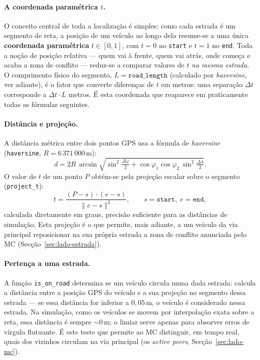 \documentclass[11pt,a4paper]{article}
\begin{document}
\paragraph{A coordenada paramétrica $t$.} O conceito central de toda a localização é
simples: como cada estrada é um segmento de reta, a posição de um veículo ao longo dela
resume-se a uma única \textbf{coordenada paramétrica} $t\in[0,1]$, com $t=0$ no
\texttt{start} e $t=1$ no \texttt{end}. Toda a noção de posição relativa --- quem vai à
frente, quem vai atrás, onde começa e acaba a zona de conflito --- reduz-se a comparar
valores de $t$ \emph{na mesma estrada}. O comprimento físico do segmento,
$L=\texttt{road\_length}$ (calculado por \emph{haversine}, ver adiante), é o fator que
converte diferenças de $t$ em metros: uma separação $\Delta t$ corresponde a $\Delta t\cdot L$
metros. É esta coordenada que reaparece em praticamente todas as fórmulas seguintes.

\paragraph{Distância e projeção.} A distância métrica entre dois pontos GPS usa a fórmula
de \emph{haversine} (\texttt{haversine}, $R=6\,371\,000$\,m):
\[
  d = 2R\,\arcsin\!\sqrt{\sin^2\!\tfrac{\Delta\varphi}{2}
      + \cos\varphi_1\cos\varphi_2\,\sin^2\!\tfrac{\Delta\lambda}{2}} .
\]
O valor de $t$ de um ponto $P$ obtém-se pela projeção escalar sobre o segmento
(\texttt{project\_t}):
\[
  t = \frac{(P - s)\cdot(e - s)}{\lVert e - s\rVert^{2}},
  \qquad s=\texttt{start},\; e=\texttt{end},
\]
calculada diretamente em graus, precisão suficiente para as distâncias de simulação.
Esta projeção é o que permite, mais adiante, a um veículo da via principal reposicionar
na sua própria estrada a zona de conflito anunciada pelo MC (Secção~\ref{sec:lado-estrada}).

\paragraph{Pertença a uma estrada.} A função \texttt{is\_on\_road} determina se um veículo
circula numa dada estrada: calcula a distância entre a posição GPS do veículo e a sua
projeção no segmento dessa estrada --- se essa distância for inferior a $0{,}05$\,m, o
veículo é considerado nessa estrada. Na simulação, como os veículos se movem por
interpolação exata sobre a reta, essa distância é sempre $\sim$0\,m; o limiar serve apenas
para absorver erros de vírgula flutuante. É este teste que permite ao MC distinguir, em
tempo real, quais dos vizinhos circulam na via principal (os \emph{active peers},
Secção~\ref{sec:lado-mc}).
\end{document}

